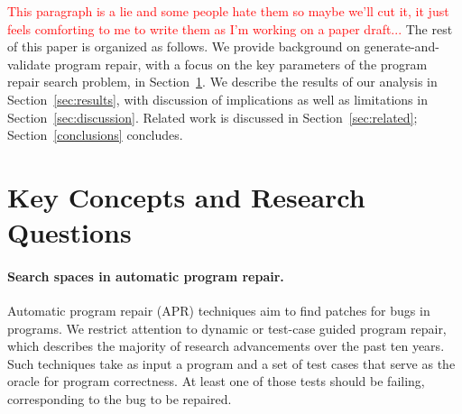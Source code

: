\documentclass[sigconf, timestamp-false, anonymous=true]{acmart}
\newcommand\todo[1]{\textcolor{red}{#1}}
\begin{document}
\todo{This paragraph is a lie and some people hate them so maybe we'll cut it,
  it just feels comforting to me to write them as I'm working on a paper draft...}
The rest of this paper is organized as follows.  We provide background on
generate-and-validate program repair, with a focus on the key parameters of the
program repair search problem, in Section~\ref{sec:background}.  We describe the results of our analysis in
Section~\ref{sec:results}, with discussion of implications as well as
limitations in Section~\ref{sec:discussion}.  Related work is discussed in
Section~\ref{sec:related}; Section~\ref{conclusions} concludes.

\section{Key Concepts and Research Questions}
\label{sec:background}

\paragraph{Search spaces in automatic program repair.} Automatic program repair (APR) techniques aim to find patches for bugs in
programs.  We restrict attention to dynamic or test-case guided program repair,
which describes the majority of research advancements over the past ten years.
Such techniques take as input a program and a set of test cases that serve as
the oracle for program correctness.  At least one of those tests should be
failing, corresponding to the bug to be repaired.  
\end{document}
